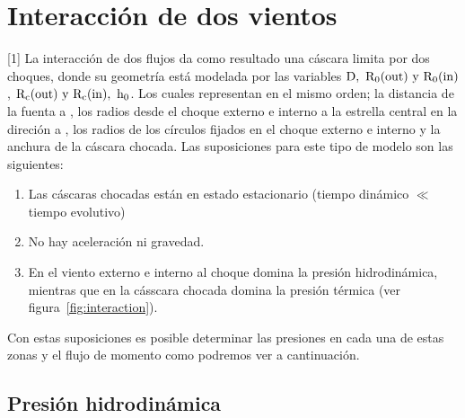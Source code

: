 % 



% 


\label{chap:theori}

\section{Interacción de dos vientos}
\label{sec:interaction}
[1]
La interacción de dos flujos da como resultado una cáscara limita por dos choques, donde su  geometría está modelada por las variables \(\mathrm{D,~R_{0}(\mathrm{out}{})~ y ~R_{0}(\mathrm{in}{})}\), \(\mathrm{ R_{c}(\mathrm{out}{})~y~R_{c}(\mathrm{in}{}),~h_{0}}\). Los cuales representan en el mismo orden; la distancia de la fuenta a \thC{}, los radios desde el choque externo e interno a la estrella central en la direción a \thC{}, los radios de los círculos fijados en el choque externo e interno y la anchura de la cáscara chocada. Las suposiciones para este tipo de modelo son las siguientes:

\begin{enumerate}
\item Las cáscaras chocadas están en estado estacionario (tiempo dinámico \(\ll\) tiempo evolutivo)
\item No hay aceleración ni gravedad.
\item En el viento externo e interno al choque domina la presión hidrodinámica, mientras que en la cásscara chocada domina la presión térmica (ver figura~\ref{fig:interaction}).  
\end{enumerate}

Con estas suposiciones es posible determinar las presiones en cada una de estas zonas y el flujo de momento como podremos ver a cantinuación.

\subsection{Presión hidrodinámica}
\label{sec:pressure}

